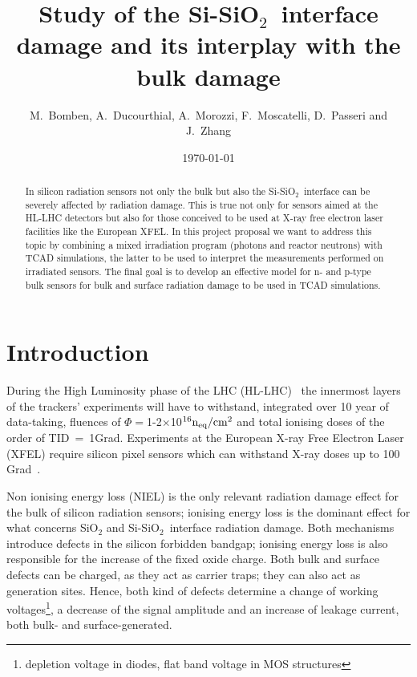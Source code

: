 \documentclass[dvips,12pt]{article}
\begin{document}
\title{Study of the Si-SiO$_2$~interface damage and its interplay with the bulk damage}
\author{M.~Bomben, A.~Ducourthial, A.~Morozzi,  F.~Moscatelli, D.~Passeri and J.~Zhang}
\date{\today}



\maketitle

\begin{abstract}
In silicon radiation sensors not only the bulk but also the Si-SiO$_2$~interface can be severely 
affected by radiation damage. This is true not only for sensors aimed at the HL-LHC detectors 
but also for those conceived to be used at X-ray free electron laser facilities like the European XFEL. 
In this project proposal we want to address this topic by combining a mixed irradiation program 
(photons and reactor neutrons) with TCAD simulations, the latter to be used to interpret the 
measurements performed on irradiated sensors. The final goal is to develop an effective model 
for n- and p-type bulk sensors for bulk and surface radiation damage to be used in TCAD 
simulations.

\end{abstract}


\section{Introduction}

During the High Luminosity phase of the LHC (HL-LHC)~\cite{HL-LHC} the innermost layers of 
 the trackers' experiments will have to 
withstand, integrated over 10 year of data-taking,
  fluences of $\Phi = $1-2$\times$10$^{16}{\rm n_{eq}/cm^2}$  and total ionising doses of the order 
  of  
 TID~=~1Grad. Experiments at the European X-ray Free Electron Laser (XFEL) require silicon 
 pixel sensors which can withstand X-ray doses up to 100 Grad~\cite{zhang-thesis}.
 
 Non ionising energy loss (NIEL) is the only relevant radiation damage effect for the 
 bulk of silicon radiation sensors; ionising energy loss is the dominant effect for what concerns 
 SiO$_2$ and Si-SiO$_2$~interface radiation damage.
 Both mechanisms introduce defects in the silicon forbidden bandgap; ionising energy loss is 
 also responsible for the increase of the fixed oxide charge. Both bulk and surface defects 
 can be charged, as they act as carrier traps; they can also act as generation sites. Hence, 
 both kind of defects determine a change of working 
 voltages\footnote{depletion voltage in diodes, flat band voltage in MOS structures}, a decrease 
 of the signal amplitude and an increase of leakage current, both bulk- and surface-generated.
\end{document}
